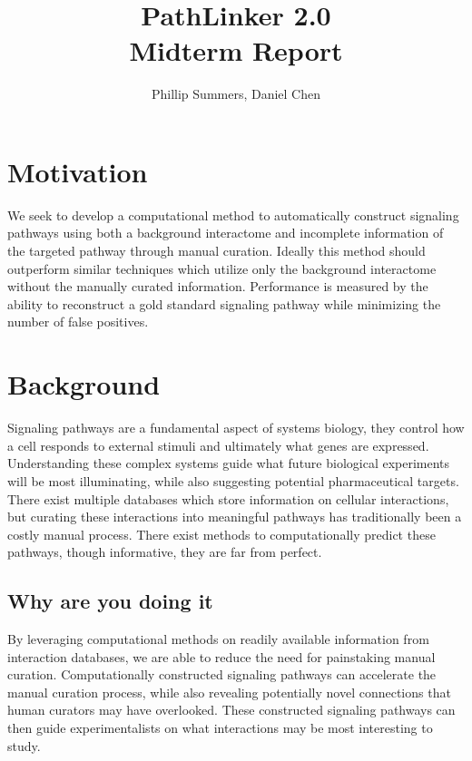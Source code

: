 \documentclass[10pt,letterpaper,twocolumn,twoside]{article}
\author{Phillip Summers, Daniel Chen}
\title{PathLinker 2.0\\Midterm Report}
\begin{document}
	\maketitle
\section{Motivation}

We seek to develop a computational method to automatically construct
signaling pathways using both a background interactome and incomplete
information of the targeted pathway through manual curation.  Ideally
this method should outperform similar techniques which utilize only
the background interactome without the manually curated information.
Performance is measured by the ability to reconstruct a gold standard
signaling pathway while minimizing the number of false positives.

\section{Background}

Signaling pathways are a fundamental aspect of systems biology, they
control how a cell responds to external stimuli and ultimately what
genes are expressed.  Understanding these complex systems guide what
future biological experiments will be most illuminating, while also
suggesting potential pharmaceutical targets.  There exist multiple
databases which store information on cellular interactions, but
curating these interactions into meaningful pathways has traditionally
been a costly manual process.  There exist methods to computationally
predict these pathways, though informative, they are far from perfect.


\subsection{Why are you doing it}

By leveraging computational methods on readily available information
from interaction databases, we are able to reduce the need for
painstaking manual curation.  Computationally constructed signaling
pathways can accelerate the manual curation process, while also
revealing potentially novel connections that human curators may have
overlooked.  These constructed signaling pathways can then guide
experimentalists on what interactions may be most interesting to
study.

\end{document}
